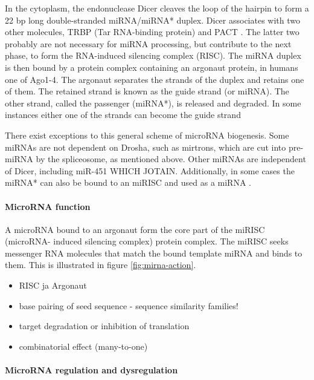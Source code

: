 In the cytoplasm, the endonuclease Dicer cleaves the loop of the hairpin to
form a 22 bp long double-stranded miRNA/miRNA* duplex. Dicer associates with
two other molecules, TRBP (Tar RNA-binding protein) and PACT \citep{Tref}. The
latter two probably are not necessary for miRNA processing, but contribute to
the next phase, to form the RNA-induced silencing complex (RISC). The miRNA
duplex is then bound by a protein complex containing an argonaut protein, in
humans one of Ago1-4. The argonaut separates the strands of the duplex and
retains one of them. The retained strand is known as the guide strand (or
miRNA). The other strand, called the passenger (miRNA*), is released and
degraded. In some instances either one of the strands can become the guide strand

There exist exceptions to this general scheme of microRNA biogenesis. Some
miRNAs are not dependent on Drosha, such as mirtrons, which are cut into pre-
miRNA by the spliceosome, as mentioned above. Other miRNAs are independent of
Dicer, including miR-451 WHICH JOTAIN. Additionally, in some cases the miRNA*
can also be bound to an miRISC and used as a miRNA \citep{CITE}.





\paragraph{MicroRNA function}\label{microrna-function}

A microRNA bound to an argonaut form the core part of the miRISC (microRNA-
induced silencing complex) protein complex. The miRISC seeks messenger RNA
molecules that match the bound template miRNA and binds to them. This is illustrated
in figure \ref{fig:mirna-action}.

\begin{itemize}
\item
  RISC ja Argonaut
\item
  base pairing of seed sequence - sequence similarity families!
\item
  target degradation or inhibition of translation
\item
  combinatorial effect (many-to-one)
\end{itemize}





\paragraph{MicroRNA regulation and dysregulation}\label{microrna-
regulation-and-dysregulation}


